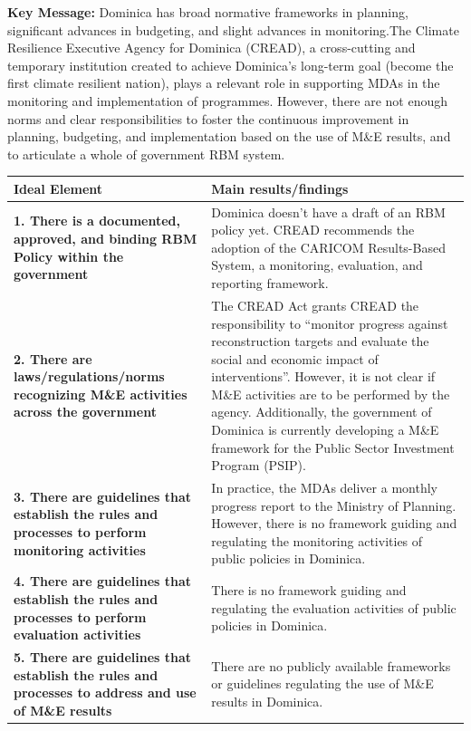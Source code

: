 \documentclass[
  10pt,
]{book}
\begin{document}
\textbf{Key Message:}
Dominica has broad normative frameworks in planning, significant advances in budgeting, and slight advances in monitoring.The Climate Resilience Executive Agency for Dominica (CREAD), a cross-cutting and temporary institution created to achieve Dominica's long-term goal (become the first climate resilient nation), plays a relevant role in supporting MDAs in the monitoring and implementation of programmes. However, there are not enough norms and clear responsibilities to foster the continuous improvement in planning, budgeting, and implementation based on the use of M\&E results, and to articulate a whole of government RBM system.

\begingroup\fontsize{12}{14}\selectfont

\begin{tabu} to 
\hline
Ideal Element & Main results/findings\\
\hline
\textbf{1. There is a documented, approved, and binding RBM Policy within the government} & Dominica doesn’t have a draft of an RBM policy yet. CREAD recommends the adoption of the CARICOM Results-Based System, a monitoring, evaluation, and reporting framework.\\
\hline
\textbf{2. There are laws/regulations/norms recognizing M\&E activities across the government} & The CREAD Act grants CREAD the responsibility to “monitor progress against reconstruction targets and evaluate the social and economic impact of interventions”. However, it is not clear if M\&E activities are to be performed by the agency. Additionally, the government of Dominica is currently developing a M\&E framework for the Public Sector Investment Program (PSIP).\\
\hline
\textbf{3. There are guidelines that establish the rules and processes to perform monitoring activities} & In practice, the MDAs deliver a monthly progress report to the Ministry of Planning. However, there is no framework guiding and regulating the monitoring activities of public policies in Dominica.\\
\hline
\textbf{4. There are guidelines that establish the rules and processes to perform evaluation activities} & There is no framework guiding and regulating the evaluation activities of public policies in Dominica.\\
\hline
\textbf{5. There are guidelines that establish the rules and processes to address and use of M\&E results} & There are no publicly available frameworks or guidelines regulating the use of M\&E results in Dominica.\\

\end{tabu}
\end{document}
